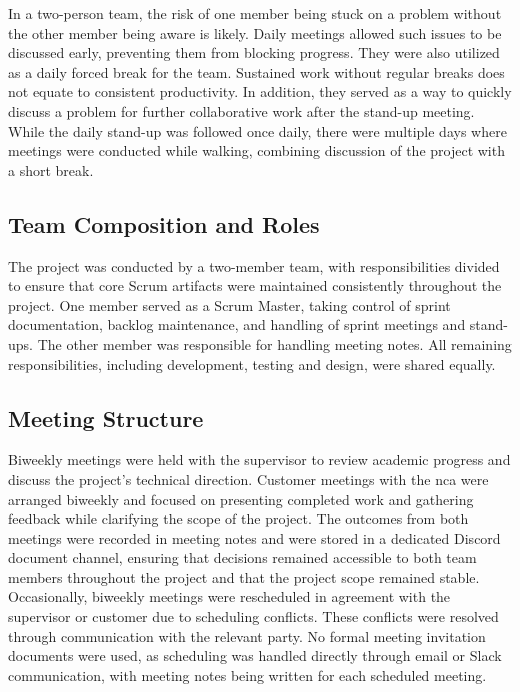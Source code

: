 In a two-person team, the risk of one member being stuck on a problem without the other member being aware is likely. Daily meetings allowed such issues to be discussed early, preventing them from blocking progress. They were also utilized as a daily forced break for the team. Sustained work without regular breaks does not equate to consistent productivity. In addition, they served as a way to quickly discuss a problem for further collaborative work after the stand-up meeting. While the daily stand-up was followed once daily, there were multiple days where meetings were conducted while walking, combining discussion of the project with a short break.



\subsection{Team Composition and Roles}

The project was conducted by a two-member team, with responsibilities divided to ensure that core Scrum artifacts were maintained consistently throughout the project. One member served as a Scrum Master, taking control of sprint documentation, backlog maintenance, and handling of sprint meetings and stand-ups. The other member was responsible for handling meeting notes. All remaining responsibilities, including development, testing and design, were shared equally. 

\subsection{Meeting Structure}
\label{sec: meeting_structure}

Biweekly meetings were held with the supervisor to review academic progress and discuss the project's technical direction. Customer meetings with the \acrshort{nca} were arranged biweekly and focused on presenting completed work and gathering feedback while clarifying the scope of the project. The outcomes from both meetings were recorded in meeting notes and were stored in a dedicated Discord document channel, ensuring that decisions remained accessible to both team members throughout the project and that the project scope remained stable. Occasionally, biweekly meetings were rescheduled in agreement with the supervisor or customer due to scheduling conflicts. These conflicts were resolved through communication with the relevant party. No formal meeting invitation documents were used, as scheduling was handled directly through email or Slack communication, with meeting notes being written for each scheduled meeting. 

